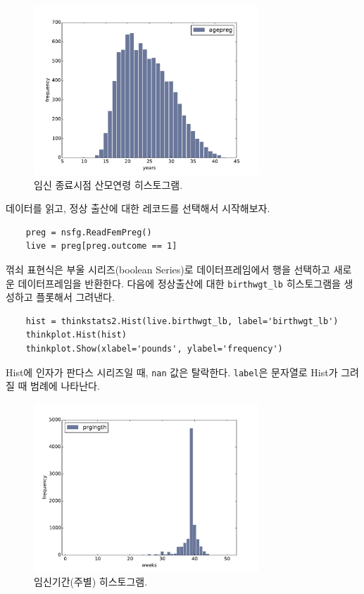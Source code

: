 \begin{figure}
\centerline{\includegraphics[height=2.5in]{figs/first_agepreg_hist.pdf}}
\caption{임신 종료시점 산모연령 히스토그램.}
\label{first_agepreg_hist}
\end{figure}

데이터를 읽고, 정상 출산에 대한 레코드를 선택해서 시작해보자.

\begin{verbatim}
    preg = nsfg.ReadFemPreg()
    live = preg[preg.outcome == 1]
\end{verbatim}

꺾쇠 표현식은 부울 시리즈(boolean Series)로 데이터프레임에서 행을 선택하고 새로운 데이터프레임을 반환한다. 다음에 정상출산에 대한 \verb"birthwgt_lb" 히스토그램을 생성하고 플롯해서 그려낸다.


\begin{verbatim}
    hist = thinkstats2.Hist(live.birthwgt_lb, label='birthwgt_lb')
    thinkplot.Hist(hist)
    thinkplot.Show(xlabel='pounds', ylabel='frequency')
\end{verbatim}

Hist에 인자가 판다스 시리즈일 때, {\tt nan} 값은 탈락한다. 
{\tt label}은 문자열로 Hist가 그려질 때 범례에 나타난다. 


\begin{figure}
\centerline{\includegraphics[height=2.5in]{figs/first_prglngth_hist.pdf}}
\caption{임신기간(주별) 히스토그램.}
\label{first_prglngth_hist}
\end{figure}

